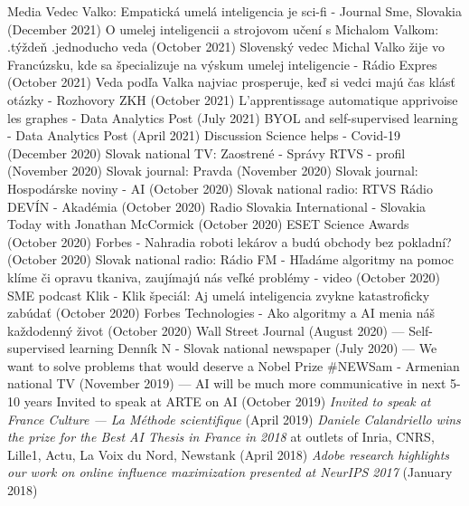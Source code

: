 \documentclass{resume}
\begin{document}
\begin{category}{Media}
\citembullet
Vedec Valko: Empatick\' a umel\' a inteligencia je sci-fi - Journal Sme, Slovakia ({\sf December 2021})
\citembullet
O umelej inteligencii a strojovom učen\' i s Michalom Valkom: .t\' y\v zde\v n .jednoducho veda ({\sf October 2021})
\citembullet
Slovenský vedec Michal Valko \v zije vo Francúzsku, kde sa \v specializuje na v\' yskum umelej inteligencie - R\' adio Expres ({\sf October 2021})
\citembullet
Veda podľa Valka najviac prosperuje, ke\v d si vedci maj\' u  \v cas kl\' as\v t ot\' azky - Rozhovory ZKH ({\sf October 2021})
\citembullet
L’apprentissage automatique apprivoise les graphes - Data Analytics Post ({\sf July 2021})
\citembullet
BYOL and self-supervised learning - Data Analytics Post ({\sf April 2021})
\citembullet
Discussion Science helps - Covid-19 ({\sf December 2020})
\citembullet
Slovak national TV: Zaostren\' e - Správy RTVS - profil  ({\sf November 2020})
\citembullet
Slovak journal: Pravda ({\sf November 2020})
\citembullet
Slovak journal: Hospod\'arske noviny - AI ({\sf  October 2020})
\citembullet
Slovak national radio: RTVS R\'adio DEV\'IN - Akad\'emia ({\sf  October 2020})
\citembullet
Radio Slovakia International - Slovakia Today with Jonathan McCormick ({\sf  October 2020})
\citembullet
ESET Science Awards ({\sf  October 2020}) 
\citembullet
Forbes - Nahradia roboti lek\'arov a bud\'u obchody bez pokladn\'i?({\sf  October 2020})
\citembullet
Slovak national radio: Rádio FM - Hľadáme algoritmy na pomoc klíme či opravu tkaniva, zaujímajú nás veľké problémy - video ({\sf  October 2020})
\citembullet
SME podcast Klik - Klik špeciál: Aj umel\'a inteligencia zvykne katastroficky zab\'uda\v{t} ({\sf  October 2020})
\citembullet
Forbes Technologies - Ako algoritmy a AI menia n\'a\v{s}  ka\v{z}dodenný \v{z}ivot ({\sf  October 2020})
\citembullet
Wall Street Journal ({\sf  August 2020}) --- Self-supervised learning
\citembullet
Denn\' ik N - Slovak national newspaper ({\sf  July 2020}) --- We want to solve problems that would deserve a Nobel Prize
\citembullet
\#NEWSam - Armenian national TV ({\sf  November 2019}) --- AI will be much more communicative in next 5-10 years
\citembullet
Invited to speak at ARTE on AI ({\sf October 2019})
\citembullet
\emph{Invited to speak at France Culture --- La M\'ethode scientifique} ({\sf April 2019})
\citembullet
\emph{Daniele Calandriello wins the prize for the Best AI Thesis in France in 2018} 
at outlets of Inria, CNRS, Lille1,  Actu,  La Voix du Nord, Newstank
({\sf April 2018})
\citembullet
\emph{Adobe research highlights our work on online influence maximization presented at NeurIPS 2017} ({\sf January 2018})

\end{category}
\end{document}
